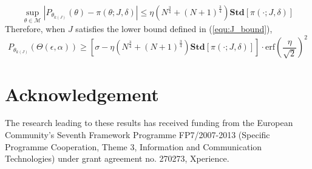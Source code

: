 \documentclass{article} %
\begin{document}
\begin{equation}
	\sup_{\theta\in\mathcal{M}}\left|P_{\theta_{k(J)}}(\theta)-\pi(\theta;J,\delta)\right|\leq \eta (N^{\frac{3}{4}}+(N+1)^{\frac{3}{4}})\mathbf{Std}[\pi(\cdot;J,\delta)]
\end{equation}
Therefore, when $J$ satisfies the lower bound defined in (\ref{equ:J_bound}),   
\begin{equation}
	P_{\theta_{k(J)}}(\Theta(\epsilon,\alpha))\geq \left[\sigma-\eta (N^{\frac{3}{4}}+(N+1)^{\frac{3}{4}})\mathbf{Std}[\pi(\cdot;J,\delta)]\right] \cdot\text{erf}(\frac{\eta}{\sqrt{2}})^2
\end{equation}
 



\newpage
\section*{Acknowledgement}
	The research leading to these results has received funding
from the European Community's Seventh Framework Programme
FP7/2007-2013 (Specific Programme Cooperation, Theme 3, Information
and Communication Technologies) under grant agreement no. 270273,
Xperience.



\footnotesize 

\end{document}

